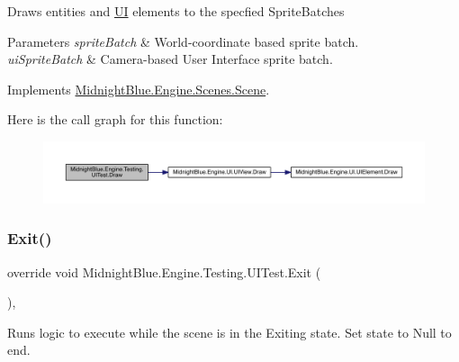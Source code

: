 Draws entities and \hyperlink{namespace_midnight_blue_1_1_engine_1_1_u_i}{UI} elements to the specfied Sprite\+Batches 


\begin{DoxyParams}{Parameters}
{\em sprite\+Batch} & World-\/coordinate based sprite batch.\\
\hline
{\em ui\+Sprite\+Batch} & Camera-\/based User Interface sprite batch.\\
\hline
\end{DoxyParams}


Implements \hyperlink{class_midnight_blue_1_1_engine_1_1_scenes_1_1_scene_a6ec0b4be6c7dc226c9afd308e1fb3fd3}{Midnight\+Blue.\+Engine.\+Scenes.\+Scene}.

Here is the call graph for this function\+:
\nopagebreak
\begin{figure}[H]
\begin{center}
\leavevmode
\includegraphics[width=350pt]{class_midnight_blue_1_1_engine_1_1_testing_1_1_u_i_test_a8c8604e47a7ac4ef8b8c74e82ff5cb83_cgraph}
\end{center}
\end{figure}
\hypertarget{class_midnight_blue_1_1_engine_1_1_testing_1_1_u_i_test_a48b16a69a8d34b0d8d2fc30ead3c79ca}{}\label{class_midnight_blue_1_1_engine_1_1_testing_1_1_u_i_test_a48b16a69a8d34b0d8d2fc30ead3c79ca} 
\subsubsection{\texorpdfstring{Exit()}{Exit()}}
{\footnotesize\ttfamily override void Midnight\+Blue.\+Engine.\+Testing.\+U\+I\+Test.\+Exit (\begin{DoxyParamCaption}{ }\end{DoxyParamCaption})\hspace{0.3cm}{\ttfamily [inline]}, {\ttfamily [virtual]}}



Runs logic to execute while the scene is in the Exiting state. Set state to Null to end. 



